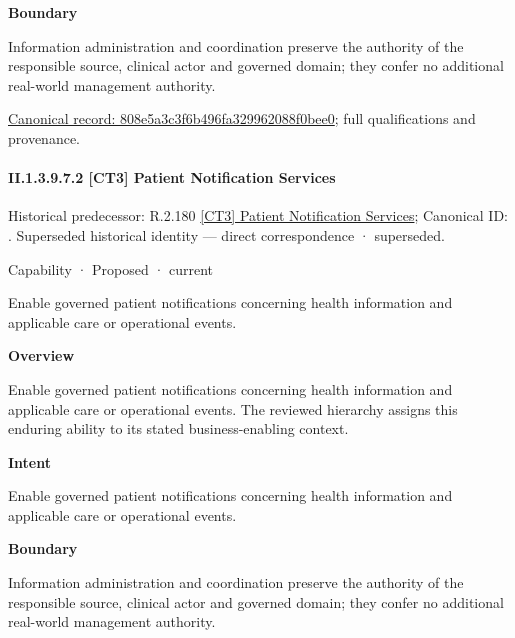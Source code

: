 \textbf{Boundary}



Information administration and coordination preserve the authority of the responsible source, clinical actor and governed domain; they confer no additional real-world management authority.


{\footnotesize \href{../../../../continuum/strategy/capability/808e5a3c3f6b496fa329962088f0bee0.md}{Canonical record: 808e5a3c3f6b496fa329962088f0bee0}; full qualifications and provenance.}\par
\paragraph*{II.1.3.9.7.2 [CT3] Patient Notification Services}
\label{navigation:II.1.3.9.7.2}

{\small Historical predecessor: R.2.180 \hyperref[element:35c5be472bf2433fbbde9646d87aefb3]{[CT3] Patient Notification Services}; Canonical ID: \texttt{}. Superseded historical identity — direct correspondence · superseded.}\par
\label{element:9d172cd511b742499c4e7c23f6630a35}
{\small Capability · Proposed · current}\par

Enable governed patient notifications concerning health information and applicable care or operational events.



\textbf{Overview}



Enable governed patient notifications concerning health information and applicable care or operational events. The reviewed hierarchy assigns this enduring ability to its stated business-enabling context.



\textbf{Intent}



Enable governed patient notifications concerning health information and applicable care or operational events.



\textbf{Boundary}



Information administration and coordination preserve the authority of the responsible source, clinical actor and governed domain; they confer no additional real-world management authority.


